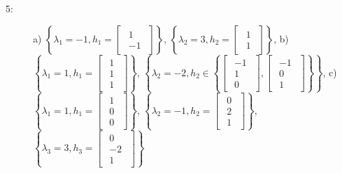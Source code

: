 \documentclass{article}
\begin{document}
\begin{description}
    \item [5:] a) $\left\{ \lambda_{1} = -1, h_{1}=\begin{bmatrix}\begin{array}{r} 1\\ -1 \end{array}\end{bmatrix} \right\}$, $\left\{ \lambda_{2} = 3, h_{2}=\begin{bmatrix}\begin{array}{r} 1\\ 1 \end{array}\end{bmatrix} \right\}$,
    b)  $\left\{ \lambda_{1} = 1, h_{1}=\begin{bmatrix}\begin{array}{r} 1\\ 1\\ 1 \end{array}\end{bmatrix} \right\}$, $\left\{ \lambda_{2} = -2, h_{2}\in \left\{ \begin{bmatrix}\begin{array}{r} -1\\ 1\\ 0 \end{array}\end{bmatrix}, \begin{bmatrix}\begin{array}{r} -1\\ 0\\ 1 \end{array}\end{bmatrix} \right\} \right\}$, 
    c)  $\left\{ \lambda_{1} = 1, h_{1}=\begin{bmatrix}\begin{array}{r} 1\\ 0\\ 0 \end{array}\end{bmatrix} \right\}$, $\left\{ \lambda_{2} = -1, h_{2}=\begin{bmatrix}\begin{array}{r} 0\\ 2\\ 1 \end{array}\end{bmatrix} \right\}$, $\left\{ \lambda_{3} = 3, h_{3}=\begin{bmatrix}\begin{array}{r} 0\\ -2\\ 1 \end{array}\end{bmatrix} \right\}$
\end{description}
\end{document}
